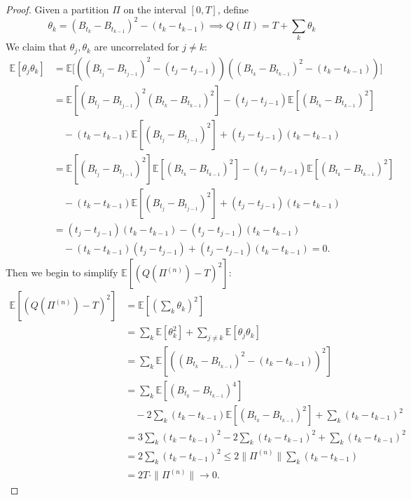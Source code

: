 \begin{proof}
Given a partition $\Pi$ on the interval $[0,T]$, define
\[
\theta_k = (B_{t_k} - B_{t_{k-1}})^2 - (t_k - t_{k-1})\implies
Q(\Pi)=T+\sum_k\theta_k
\]
We claim that $\theta_j,\theta_k$ are uncorrelated for $j\ne k$:
\begin{align*}
\mathbb{E}[\theta_j\theta_k]&=
\mathbb{E}\bigg[
\left((B_{t_j} - B_{t_{j-1}})^2 - (t_j - t_{j-1})\right)
\left((B_{t_k} - B_{t_{k-1}})^2 - (t_k - t_{k-1})\right)
\bigg]\\
&=
\mathbb{E}\left[
(B_{t_j} - B_{t_{j-1}})^2(B_{t_k} - B_{t_{k-1}})^2
\right]
-
(t_j - t_{j-1})\mathbb{E}\left[(B_{t_k} - B_{t_{k-1}})^2\right]\\
&\quad -(t_k - t_{k-1})\mathbb{E}\left[(B_{t_j} - B_{t_{j-1}})^2\right] + (t_j - t_{j-1})(t_k - t_{k-1})\\
&=
\mathbb{E}\left[
(B_{t_j} - B_{t_{j-1}})^2\right]\mathbb{E}\left[(B_{t_k} - B_{t_{k-1}})^2
\right]
-
(t_j - t_{j-1})\mathbb{E}\left[(B_{t_k} - B_{t_{k-1}})^2\right]\\
&\quad -(t_k - t_{k-1})\mathbb{E}\left[(B_{t_j} - B_{t_{j-1}})^2\right] + (t_j - t_{j-1})(t_k - t_{k-1})\\
&=(t_{j}-t_{j-1})(t_{k}-t_{k-1})-(t_j - t_{j-1})(t_{k}-t_{k-1})\\&\quad-(t_k - t_{k-1})(t_{j}-t_{j-1})+ (t_j - t_{j-1})(t_k - t_{k-1})=0.
\end{align*}
Then we begin to simplify $\mathbb{E}[
(Q(\Pi^{(n)}) - T)^2
]$:
\begin{align*}
\mathbb{E}\left[
(Q(\Pi^{(n)}) - T)^2
\right]
&=\mathbb{E}\left[
(\sum_k\theta_k)^2
\right]\\
&=\sum_k\mathbb{E}\left[
\theta_k^2
\right]+\sum_{j\ne k}\mathbb{E}\left[
\theta_j\theta_k
\right]\\
&=\sum_k\mathbb{E}\left[
\left((B_{t_k} - B_{t_{k-1}})^2 - (t_k - t_{k-1})\right)^2
\right]\\
&=
\sum_k\mathbb{E}\left[
(B_{t_k} - B_{t_{k-1}})^4
\right]\\&\quad-2\sum_k(t_k - t_{k-1})\mathbb{E}\left[
(B_{t_k} - B_{t_{k-1}})^2
\right]+\sum_k(t_k - t_{k-1})^2\\
&=3\sum_k(t_k - t_{k-1})^2 - 2\sum_k(t_k - t_{k-1})^2 + \sum_k(t_k - t_{k-1})^2\\
&=2\sum_k(t_k - t_{k-1})^2\le 2\|\Pi^{(n)}\|\sum_k(t_k - t_{k-1})\\
&=2T\cdot \|\Pi^{(n)}\|\to0.
\end{align*}
\end{proof}

